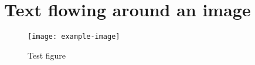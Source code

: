 \documentclass[a5paper]{article}
\begin{document}
\section*{Text flowing around an image}
\blindtext
\begin{wrapfigure}{l}{4cm}
  \texttt{[image:  example-image]}
  \caption{Test figure}
\end{wrapfigure}
\blindtext
\end{document}

